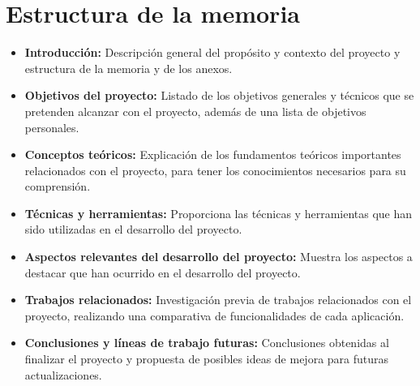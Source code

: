\vfill

\section{Estructura de la memoria}
\begin{itemize}
\tightlist
    \item
        \textbf{Introducción:} Descripción general del propósito y contexto del proyecto y estructura de la memoria y de los anexos.
    \item 
        \textbf{Objetivos del proyecto:} Listado de los objetivos generales y técnicos que se pretenden alcanzar con el proyecto, además de una lista de objetivos personales.
    \item 
        \textbf{Conceptos teóricos:} Explicación de los fundamentos teóricos importantes relacionados con el proyecto, para tener los conocimientos necesarios para su comprensión.
    \item 
        \textbf{Técnicas y herramientas:} Proporciona las técnicas y herramientas que han sido utilizadas en el desarrollo del proyecto. 
    \item 
        \textbf{Aspectos relevantes del desarrollo del proyecto:} Muestra los aspectos a destacar que han ocurrido en el desarrollo del proyecto.
    \item 
        \textbf{Trabajos relacionados:} Investigación previa de trabajos relacionados con el proyecto, realizando una comparativa de funcionalidades de cada aplicación.
    \item 
        \textbf{Conclusiones y líneas de trabajo futuras:} Conclusiones obtenidas al finalizar el proyecto y propuesta de posibles ideas de mejora para futuras actualizaciones.
\end{itemize}

\clearpage

